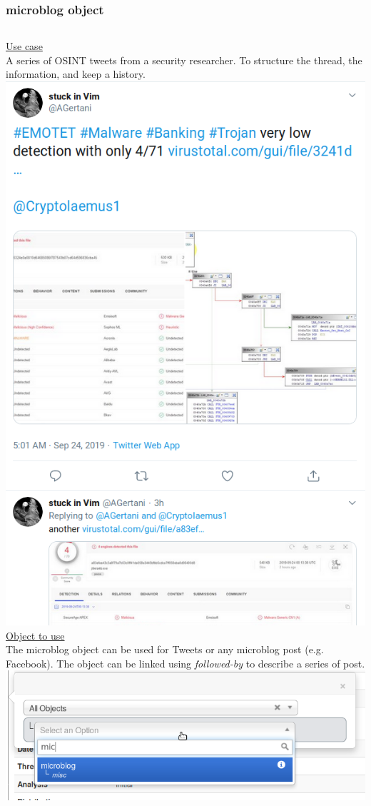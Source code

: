 \begin{frame}
\frametitle{microblog object}
\begin{columns}[totalwidth=\textwidth]
        \underline{Use case}\\
A series of OSINT tweets from a security researcher.
To structure the thread, the information,
and keep a history.\\
        \includegraphics[scale=0.15]{emotet.png}
        \underline{Object to use}\\
        The microblog object can be used for Tweets or any microblog post (e.g. Facebook). The object can be linked using {\it followed-by} to describe a series of post.\\
        \includegraphics[scale=0.15]{microblog.png}
\end{columns}
\end{frame}


